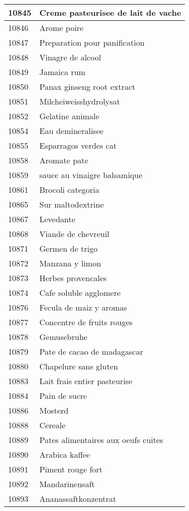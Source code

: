 \begin{longtable}{|l|l|}
10845 & Creme pasteurisee de lait de vache \\ \hline 
10846 & Arome poire \\ \hline 
10847 & Preparation pour panification \\ \hline 
10848 & Vinagre de alcool \\ \hline 
10849 & Jamaica rum \\ \hline 
10850 & Panax ginseng root extract \\ \hline 
10851 & Milcheiweisshydrolysat \\ \hline 
10852 & Gelatine animale \\ \hline 
10854 & Eau demineralisee \\ \hline 
10855 & Esparragos verdes cat \\ \hline 
10858 & Aromate pate \\ \hline 
10859 & sauce au vinaigre balsamique \\ \hline 
10861 & Brocoli categoria \\ \hline 
10865 & Sur maltodextrine \\ \hline 
10867 & Levedante \\ \hline 
10868 & Viande de chevreuil \\ \hline 
10871 & Germen de trigo \\ \hline 
10872 & Manzana y limon \\ \hline 
10873 & Herbes provencales \\ \hline 
10874 & Cafe soluble agglomere \\ \hline 
10876 & Fecula de maiz y aromas \\ \hline 
10877 & Concentre de fruits rouges \\ \hline 
10878 & Gemusebruhe \\ \hline 
10879 & Pate de cacao de madagascar \\ \hline 
10880 & Chapelure sans gluten \\ \hline 
10883 & Lait frais entier pasteurise \\ \hline 
10884 & Pain de sucre \\ \hline 
10886 & Mosterd \\ \hline 
10888 & Cereale \\ \hline 
10889 & Pates alimentaires aux oeufs cuites \\ \hline 
10890 & Arabica kaffee \\ \hline 
10891 & Piment rouge fort \\ \hline 
10892 & Mandarinensaft \\ \hline 
10893 & Ananassaftkonzentrat \\ \hline 

\end{longtable}
